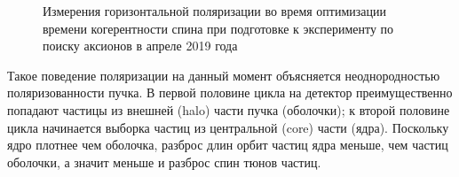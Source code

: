 \begin{figure}[H]\centering
\end{figure}
\begin{figure}[H]\centering
	\caption{Измерения горизонтальной поляризации во время оптимизации времени когерентности спина при подготовке к эксперименту по поиску аксионов в апреле 2019 года\label{fig:April2019:Polarization}}
\end{figure}

Такое поведение поляризации на данный момент объясняется неоднородностью поляризованности пучка. В первой половине цикла на детектор преимущественно попадают частицы из внешней (halo) части пучка (оболочки); к второй половине цикла начинается выборка частиц из центральной (core) части (ядра). Поскольку ядро плотнее чем оболочка, разброс длин орбит частиц ядра меньше, чем частиц оболочки, а значит меньше и разброс спин тюнов частиц.

